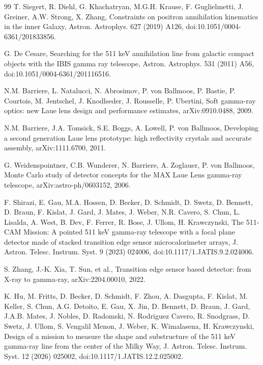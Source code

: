 \documentclass[11pt]{article}
\begin{document}
\begin{thebibliography}{99}
T. Siegert, R. Diehl, G. Khachatryan, M.G.H. Krause, F. Guglielmetti, J. Greiner, A.W. Strong, X. Zhang, Constraints on positron annihilation kinematics in the inner Galaxy, Astron. Astrophys. 627 (2019) A126, doi:10.1051/0004-6361/201833856.

G. De Cesare, Searching for the 511 keV annihilation line from galactic compact objects with the IBIS gamma ray telescope, Astron. Astrophys. 531 (2011) A56, doi:10.1051/0004-6361/201116516.

N.M. Barriere, L. Natalucci, N. Abrosimov, P. von Ballmoos, P. Bastie, P. Courtois, M. Jentschel, J. Knodlseder, J. Rousselle, P. Ubertini, Soft gamma-ray optics: new Laue lens design and performance estimates, arXiv:0910.0488, 2009.

N.M. Barriere, J.A. Tomsick, S.E. Boggs, A. Lowell, P. von Ballmoos, Developing a second generation Laue lens prototype: high reflectivity crystals and accurate assembly, arXiv:1111.6700, 2011.

G. Weidenspointner, C.B. Wunderer, N. Barriere, A. Zoglauer, P. von Ballmoos, Monte Carlo study of detector concepts for the MAX Laue Lens gamma-ray telescope, arXiv:astro-ph/0603152, 2006.

F. Shirazi, E. Gau, M.A. Hossen, D. Becker, D. Schmidt, D. Swetz, D. Bennett, D. Braun, F. Kislat, J. Gard, J. Mates, J. Weber, N.R. Cavero, S. Chun, L. Lisalda, A. West, B. Dev, F. Ferrer, R. Bose, J. Ullom, H. Krawczynski, The 511-CAM Mission: A pointed 511 keV gamma-ray telescope with a focal plane detector made of stacked transition edge sensor microcalorimeter arrays, J. Astron. Telesc. Instrum. Syst. 9 (2023) 024006, doi:10.1117/1.JATIS.9.2.024006.

S. Zhang, J.-K. Xia, T. Sun, et al., Transition edge sensor based detector: from X-ray to gamma-ray, arXiv:2204.00010, 2022.

K. Hu, M. Fritts, D. Becker, D. Schmidt, F. Zhou, A. Dasgupta, F. Kislat, M. Keller, S. Chun, A.G. Detoito, E. Gau, X. Jin, D. Bennett, D. Braun, J. Gard, J.A.B. Mates, J. Nobles, D. Radomski, N. Rodriguez Cavero, R. Snodgrass, D. Swetz, J. Ullom, S. Vengalil Menon, J. Weber, K. Wimalasena, H. Krawczynski, Design of a mission to measure the shape and substructure of the 511 keV gamma-ray line from the center of the Milky Way, J. Astron. Telesc. Instrum. Syst. 12 (2026) 025002, doi:10.1117/1.JATIS.12.2.025002.


\end{thebibliography}
\end{document}

